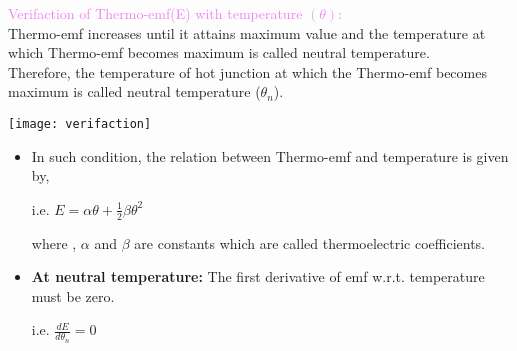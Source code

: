 \documentclass{beamer}
\begin{document}
\begin{frame}
\textcolor{violet}{Verifaction of Thermo-emf(E) with temperature $(\theta)$:} \\

Thermo-emf increases until it attains maximum value and the temperature at which Thermo-emf becomes maximum is called neutral temperature.\\
Therefore, the temperature of hot junction at which the Thermo-emf becomes maximum is called neutral
temperature ($\theta_n$).
\begin{center}
\texttt{[image: verifaction]}
\end{center}
\begin{itemize}
\item In such condition, the relation between Thermo-emf and temperature is
given by,\\
\begin{center}
i.e. $E=\alpha\theta+\frac{1}{2}\beta\theta^2$ \\
\end{center}

where , $\alpha$ and $\beta$ are constants which are called thermoelectric coefficients.
\item \textbf{At neutral temperature:} The first derivative of emf w.r.t. temperature must be zero.\\
\begin{center}
i.e. $\frac{dE}{d\theta_n}=0$
\end{center}

\end{itemize}

\end{frame}
\end{document}

